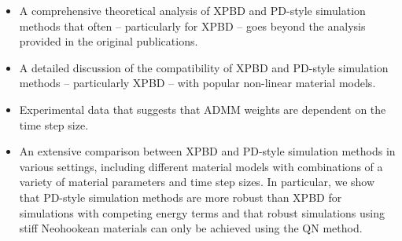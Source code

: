\begin{itemize}
    \item A comprehensive theoretical analysis of XPBD and PD-style simulation methods that often -- particularly for XPBD -- goes beyond the 
    analysis provided in the original publications. 
    \item A detailed discussion of the compatibility of XPBD and PD-style simulation methods -- particularly XPBD -- with popular non-linear 
    material models.
    \item Experimental data that suggests that ADMM weights are dependent on the time step size.
    \item An extensive comparison between XPBD and PD-style simulation methods in various settings, including different material models with 
    combinations of a variety of material parameters and time step sizes. In particular, we show that PD-style simulation methods are more 
    robust than XPBD for simulations with competing energy terms and that robust simulations using stiff Neohookean materials can only be achieved 
    using the QN method.
\end{itemize}
